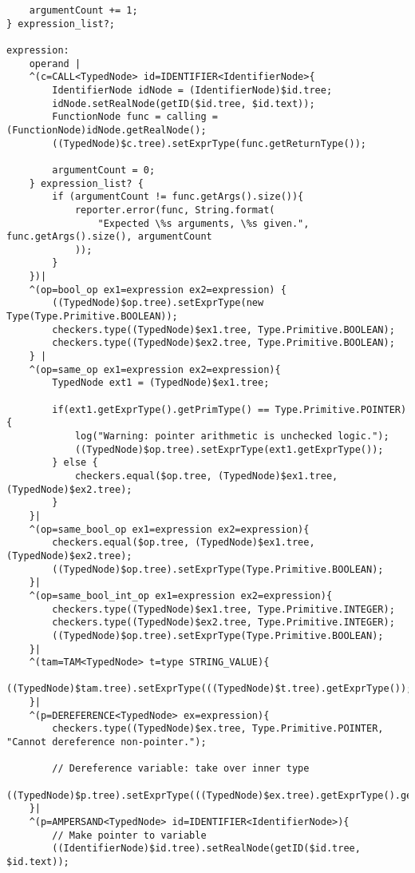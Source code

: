 \begin{landscape}
\begin{lstlisting}
    argumentCount += 1;
} expression_list?;

expression:
    operand |
    ^(c=CALL<TypedNode> id=IDENTIFIER<IdentifierNode>{
        IdentifierNode idNode = (IdentifierNode)$id.tree;
        idNode.setRealNode(getID($id.tree, $id.text));
        FunctionNode func = calling = (FunctionNode)idNode.getRealNode();
        ((TypedNode)$c.tree).setExprType(func.getReturnType());

        argumentCount = 0;
    } expression_list? {
        if (argumentCount != func.getArgs().size()){
            reporter.error(func, String.format(
                "Expected \%s arguments, \%s given.", func.getArgs().size(), argumentCount
            ));
        }
    })|
    ^(op=bool_op ex1=expression ex2=expression) {
        ((TypedNode)$op.tree).setExprType(new Type(Type.Primitive.BOOLEAN));
        checkers.type((TypedNode)$ex1.tree, Type.Primitive.BOOLEAN);
        checkers.type((TypedNode)$ex2.tree, Type.Primitive.BOOLEAN);
    } |
    ^(op=same_op ex1=expression ex2=expression){
        TypedNode ext1 = (TypedNode)$ex1.tree;

        if(ext1.getExprType().getPrimType() == Type.Primitive.POINTER){
            log("Warning: pointer arithmetic is unchecked logic.");
            ((TypedNode)$op.tree).setExprType(ext1.getExprType());
        } else {
            checkers.equal($op.tree, (TypedNode)$ex1.tree, (TypedNode)$ex2.tree);
        }
    }|
    ^(op=same_bool_op ex1=expression ex2=expression){
        checkers.equal($op.tree, (TypedNode)$ex1.tree, (TypedNode)$ex2.tree);
        ((TypedNode)$op.tree).setExprType(Type.Primitive.BOOLEAN);
    }|
    ^(op=same_bool_int_op ex1=expression ex2=expression){
        checkers.type((TypedNode)$ex1.tree, Type.Primitive.INTEGER);
        checkers.type((TypedNode)$ex2.tree, Type.Primitive.INTEGER);
        ((TypedNode)$op.tree).setExprType(Type.Primitive.BOOLEAN);
    }|
    ^(tam=TAM<TypedNode> t=type STRING_VALUE){
        ((TypedNode)$tam.tree).setExprType(((TypedNode)$t.tree).getExprType());
    }|
    ^(p=DEREFERENCE<TypedNode> ex=expression){
        checkers.type((TypedNode)$ex.tree, Type.Primitive.POINTER, "Cannot dereference non-pointer.");

        // Dereference variable: take over inner type
        ((TypedNode)$p.tree).setExprType(((TypedNode)$ex.tree).getExprType().getInnerType());
    }|
    ^(p=AMPERSAND<TypedNode> id=IDENTIFIER<IdentifierNode>){
        // Make pointer to variable
        ((IdentifierNode)$id.tree).setRealNode(getID($id.tree, $id.text));


\end{lstlisting}
\end{landscape}
